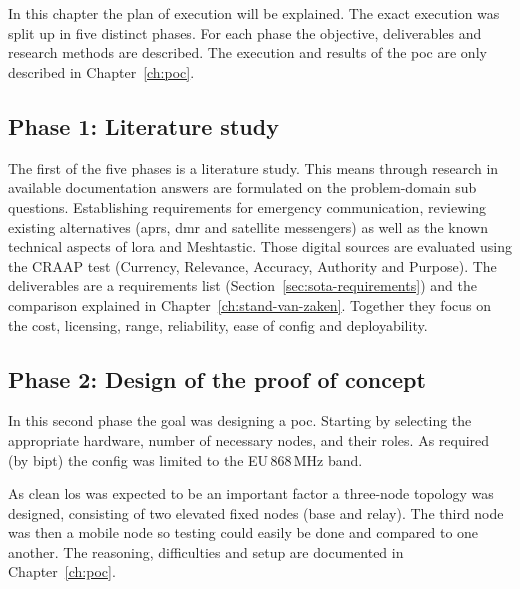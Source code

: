 
\chapter{}%
\label{ch:methodologie}

In this chapter the plan of execution will be explained.
The exact execution was split up in five distinct phases.
For each phase the objective, deliverables and research methods are described.
The execution and results of the \gls{poc} are only described in Chapter~\ref{ch:poc}.

\section{Phase 1: Literature study}%
\label{sec:method-literature}

The first of the five phases is a literature study. This means through research in available documentation answers are formulated on the problem-domain sub questions.
Establishing requirements for emergency communication, reviewing existing alternatives (\gls{aprs}, \gls{dmr} and satellite messengers) as well as the known technical aspects of \gls{lora} and Meshtastic.
Those digital sources are evaluated using the CRAAP test (Currency, Relevance, Accuracy, Authority and Purpose).
The deliverables are a requirements list (Section~\ref{sec:sota-requirements}) and the comparison explained in Chapter~\ref{ch:stand-van-zaken}.
Together they focus on the cost, licensing, range, reliability, ease of config and deployability.

\section{Phase 2: Design of the proof of concept}%
\label{sec:method-design}

In this second phase the goal was designing a \gls{poc}. Starting by selecting the appropriate hardware, number of necessary nodes, and their roles. As required (by \gls{bipt}) the config was limited to the EU\,868\,MHz band.

As clean \gls{los} was expected to be an important factor a three-node topology was designed, consisting of two elevated fixed nodes (base and relay).
The third node was then a mobile node so testing could easily be done and compared to one another.
The reasoning, difficulties and setup are documented in Chapter~\ref{ch:poc}.

